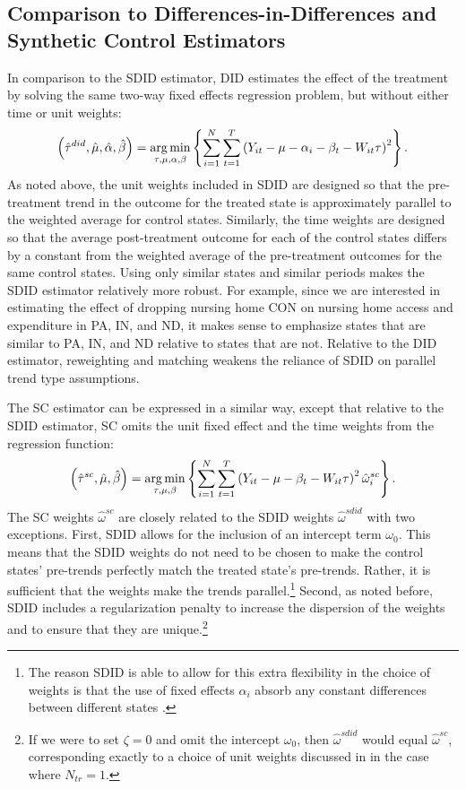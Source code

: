 \documentclass[../Main.tex]{subfiles}
\begin{document}
\subsection{Comparison to Differences-in-Differences and Synthetic Control Estimators} \label{did_sc_comp}

In comparison to the SDID estimator, DID estimates the effect of the treatment by solving the same two-way fixed effects regression problem, but without either time or unit weights:
\begin{equation} \label{eq:did_reg}
    \left(\hat{\tau}^{did},\hat{\mu},\hat{\alpha},\hat{\beta}\right)=\operatorname*{arg\,min}_{\tau,\mu,\alpha,\beta}\left\{\sum_{i=1}^N\sum_{t=1}^T\left(Y_{it}-\mu-\alpha_i-\beta_t-W_{it}\tau\right)^2\right\}.
\end{equation}
As noted above, the unit weights included in SDID are designed so that the pre-treatment trend in the outcome for the treated state is approximately parallel to the weighted average for control states. Similarly, the time weights are designed so that the average post-treatment outcome for each of the control states differs by a constant from the weighted average of the pre-treatment outcomes for the same control states. Using only similar states and similar periods makes the SDID estimator relatively more robust. For example, since we are interested in estimating the effect of dropping nursing home CON on nursing home access and expenditure in PA, IN, and ND, it makes sense to emphasize states that are similar to PA, IN, and ND relative to states that are not. Relative to the DID estimator, reweighting and matching weakens the reliance of SDID on parallel trend type assumptions.

The SC estimator can be expressed in a similar way, except that relative to the SDID estimator, SC omits the unit fixed effect and the time weights from the regression function:
\begin{equation} \label{eq:sc_reg}
    \left(\hat{\tau}^{sc},\hat{\mu},\hat{\beta}\right)=\operatorname*{arg\,min}_{\tau,\mu,\beta}\left\{\sum_{i=1}^N\sum_{t=1}^T\left(Y_{it}-\mu-\beta_t-W_{it}\tau\right)^2\hat{\omega}_i^{sc}\right\}.
\end{equation}
The SC weights $\hat{\omega}^{sc}$ are closely related to the SDID weights $\hat{\omega}^{sdid}$ with two exceptions. First, SDID allows for the inclusion of an intercept term $\omega_0$. This means that the SDID weights do not need to be chosen to make the control states' pre-trends perfectly match the treated state's pre-trends. Rather, it is sufficient that the weights make the trends parallel.\footnote{The reason SDID is able to allow for this extra flexibility in the choice of weights is that the use of fixed effects $\alpha_i$ absorb any constant differences between different states \citep{arkhangelsky2021synthetic}.} Second, as noted before, SDID includes a regularization penalty to increase the dispersion of the weights and to ensure that they are unique.\footnote{If we were to set $\zeta=0$ and omit the intercept $\omega_0$, then $\hat{\omega}^{sdid}$ would equal $\hat{\omega}^{sc}$, corresponding exactly to a choice of unit weights discussed in \citet{abadie2010synthetic} in the case where $N_{tr}=1$.}
\end{document}
